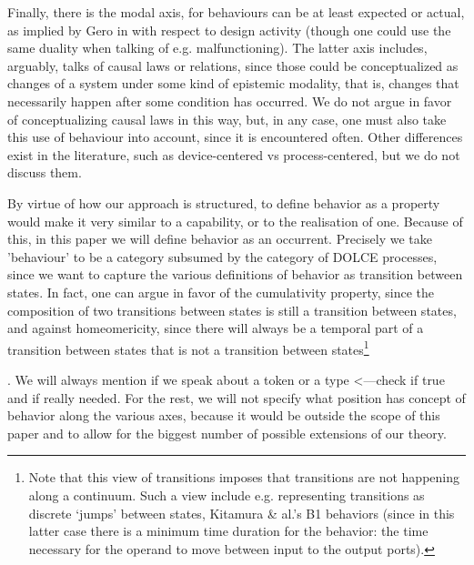 \documentclass[sw]{iosart2x}
\newcommand{\DOLCE}{\textsc{DOLCE}\xspace} %
\newcommand{\TODO}[1]{{\color{red} #1}}
\begin{document}
{Finally, there is the modal axis, for behaviours can be at least expected or actual, as implied by Gero in \cite{geroSituatedFunctionBehaviour2004} with respect to design activity (though one could use the same duality when talking of e.g. malfunctioning).
The latter axis includes, arguably, talks of causal laws or relations, since those could be conceptualized as changes of a system under some kind of epistemic modality, that is, changes that necessarily happen after some condition has occurred.
We do not argue in favor of conceptualizing causal laws in this way, but, in any case, one must also take this use of behaviour into account, since it is encountered often.
Other differences exist in the literature, such as device-centered vs process-centered, but we do not discuss them. 

By virtue of how our approach is structured, to define behavior as a property would make it very similar to a capability, or to the realisation of one.  
Because of this, in this paper we will define behavior as an occurrent. 
Precisely we take 'behaviour' to be a category subsumed by the category of \DOLCE processes, since we want to capture the various definitions of behavior as transition between states.
In fact, one can argue in favor of the cumulativity property, since the composition of two transitions between states is still a transition between states, and against homeomericity, since there will always be a temporal part of a transition between states that is not a transition between states\footnote{Note that this view of transitions imposes that transitions are not happening along a continuum. Such a view include e.g. representing transitions as discrete `jumps' between states, Kitamura \& al.'s B1 behaviors (since in this latter case there is a minimum time duration for the behavior: the time necessary for the operand to move between input to the output ports).}}.  
We will always mention if we speak about a token or a type \TODO{<---check if true and if really needed}.
For the rest, we will not specify what position has concept of behavior along the various axes, because it would be outside the scope of this paper and to allow for the biggest number of possible extensions of our theory. 
\end{document}
